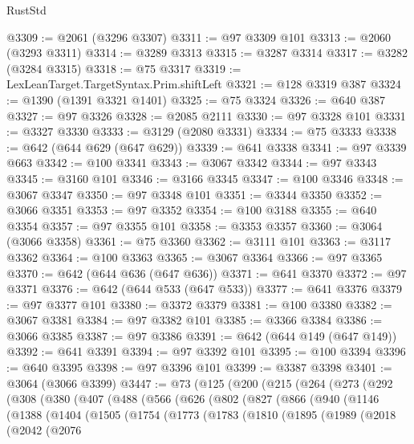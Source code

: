 \begin{lexlean}{RustStd}
\begin{coremodule}
@3309 := @2061 (@3296 @3307)
@3311 := @97 @3309 @101
@3313 := @2060 (@3293 @3311)
@3314 := @3289 @3313
@3315 := @3287 @3314
@3317 := @3282 (@3284 @3315)
@3318 := @75 @3317
@3319 := LexLeanTarget.TargetSyntax.Prim.shiftLeft
@3321 := @128 @3319 @387
@3324 := @1390 (@1391 @3321 @1401)
@3325 := @75 @3324
@3326 := @640 @387
@3327 := @97 @3326
@3328 := @2085 @2111
@3330 := @97 @3328 @101
@3331 := @3327 @3330
@3333 := @3129 (@2080 @3331)
@3334 := @75 @3333
@3338 := @642 (@644 @629 (@647 @629))
@3339 := @641 @3338
@3341 := @97 @3339 @663
@3342 := @100 @3341
@3343 := @3067 @3342
@3344 := @97 @3343
@3345 := @3160 @101
@3346 := @3166 @3345
@3347 := @100 @3346
@3348 := @3067 @3347
@3350 := @97 @3348 @101
@3351 := @3344 @3350
@3352 := @3066 @3351
@3353 := @97 @3352
@3354 := @100 @3188
@3355 := @640 @3354
@3357 := @97 @3355 @101
@3358 := @3353 @3357
@3360 := @3064 (@3066 @3358)
@3361 := @75 @3360
@3362 := @3111 @101
@3363 := @3117 @3362
@3364 := @100 @3363
@3365 := @3067 @3364
@3366 := @97 @3365
@3370 := @642 (@644 @636 (@647 @636))
@3371 := @641 @3370
@3372 := @97 @3371
@3376 := @642 (@644 @533 (@647 @533))
@3377 := @641 @3376
@3379 := @97 @3377 @101
@3380 := @3372 @3379
@3381 := @100 @3380
@3382 := @3067 @3381
@3384 := @97 @3382 @101
@3385 := @3366 @3384
@3386 := @3066 @3385
@3387 := @97 @3386
@3391 := @642 (@644 @149 (@647 @149))
@3392 := @641 @3391
@3394 := @97 @3392 @101
@3395 := @100 @3394
@3396 := @640 @3395
@3398 := @97 @3396 @101
@3399 := @3387 @3398
@3401 := @3064 (@3066 @3399)
@3447 := @73
    (@125
      (@200
        (@215
          (@264
            (@273
              (@292
                (@308
                  (@380
                    (@407
                      (@488
                        (@566
                          (@626
                            (@802
                              (@827
                                (@866
                                  (@940
                                    (@1146
                                      (@1388
                                        (@1404
                                          (@1505
                                            (@1754
                                              (@1773
                                                (@1783
                                                  (@1810
                                                    (@1895
                                                      (@1989
                                                        (@2018
                                                          (@2042
                                                            (@2076

\end{coremodule}
\end{lexlean}
